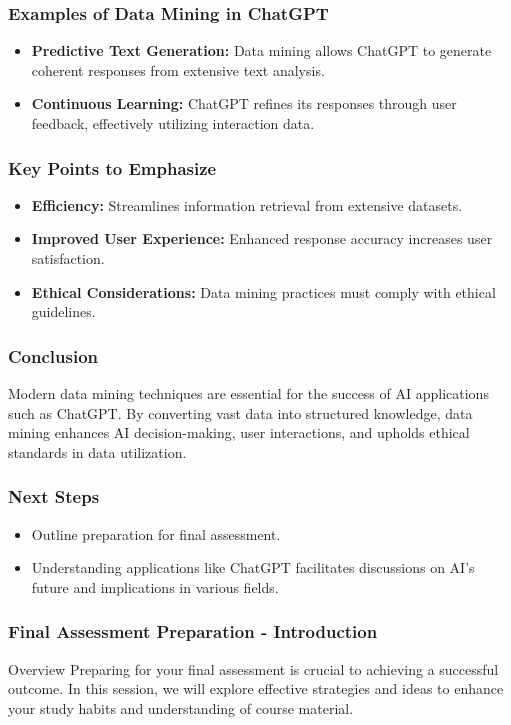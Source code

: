\documentclass[aspectratio=169]{beamer}
\begin{document}
\begin{frame}[fragile]
    \frametitle{Examples of Data Mining in ChatGPT}
    \begin{itemize}
        \item \textbf{Predictive Text Generation:}
            Data mining allows ChatGPT to generate coherent responses from extensive text analysis.
            
        \item \textbf{Continuous Learning:}
            ChatGPT refines its responses through user feedback, effectively utilizing interaction data.
    \end{itemize}
\end{frame}

\begin{frame}[fragile]
    \frametitle{Key Points to Emphasize}
    \begin{itemize}
        \item \textbf{Efficiency:} Streamlines information retrieval from extensive datasets.
        \item \textbf{Improved User Experience:} Enhanced response accuracy increases user satisfaction.
        \item \textbf{Ethical Considerations:} Data mining practices must comply with ethical guidelines.
    \end{itemize}
\end{frame}

\begin{frame}[fragile]
    \frametitle{Conclusion}
    Modern data mining techniques are essential for the success of AI applications such as ChatGPT. By converting vast data into structured knowledge, data mining enhances AI decision-making, user interactions, and upholds ethical standards in data utilization.
\end{frame}

\begin{frame}[fragile]
    \frametitle{Next Steps}
    \begin{itemize}
        \item Outline preparation for final assessment.
        \item Understanding applications like ChatGPT facilitates discussions on AI's future and implications in various fields.
    \end{itemize}
\end{frame}

\begin{frame}[fragile]
    \frametitle{Final Assessment Preparation - Introduction}
    \begin{block}{Overview}
        Preparing for your final assessment is crucial to achieving a successful outcome. In this session, we will explore effective strategies and ideas to enhance your study habits and understanding of course material.
    \end{block}
\end{frame}
\end{document}
